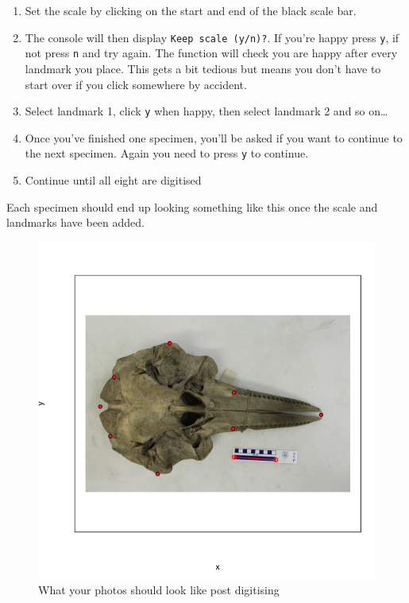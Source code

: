 \documentclass[]{book}
\providecommand{\tightlist}{%
  \setlength{\itemsep}{0pt}\setlength{\parskip}{0pt}}
\begin{document}
\begin{enumerate}
\def\labelenumi{\arabic{enumi}.}
\tightlist
\item
  Set the scale by clicking on the start and end of the black scale bar.
\item
  The console will then display \texttt{Keep\ scale\ (y/n)?}. If you're
  happy press \texttt{y}, if not press \texttt{n} and try again. The
  function will check you are happy after every landmark you place. This
  gets a bit tedious but means you don't have to start over if you click
  somewhere by accident.
\item
  Select landmark 1, click \texttt{y} when happy, then select landmark 2
  and so on\ldots{}
\item
  Once you've finished one specimen, you'll be asked if you want to
  continue to the next specimen. Again you need to press \texttt{y} to
  continue.
\item
  Continue until all eight are digitised
\end{enumerate}

Each specimen should end up looking something like this once the scale
and landmarks have been added.

\begin{figure}
\centering
\includegraphics{whale3.png}
\caption{What your photos should look like post digitising}
\end{figure}
\end{document}
